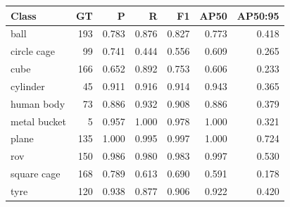 \begin{tabular}{lrrrrrr}
\toprule
Class & GT & P & R & F1 & AP50 & AP50:95 \\
\midrule
ball & 193 & 0.783 & 0.876 & 0.827 & 0.773 & 0.418 \\
circle cage & 99 & 0.741 & 0.444 & 0.556 & 0.609 & 0.265 \\
cube & 166 & 0.652 & 0.892 & 0.753 & 0.606 & 0.233 \\
cylinder & 45 & 0.911 & 0.916 & 0.914 & 0.943 & 0.365 \\
human body & 73 & 0.886 & 0.932 & 0.908 & 0.886 & 0.379 \\
metal bucket & 5 & 0.957 & 1.000 & 0.978 & 1.000 & 0.321 \\
plane & 135 & 1.000 & 0.995 & 0.997 & 1.000 & 0.724 \\
rov & 150 & 0.986 & 0.980 & 0.983 & 0.997 & 0.530 \\
square cage & 168 & 0.789 & 0.613 & 0.690 & 0.591 & 0.178 \\
tyre & 120 & 0.938 & 0.877 & 0.906 & 0.922 & 0.420 \\
\bottomrule
\end{tabular}
